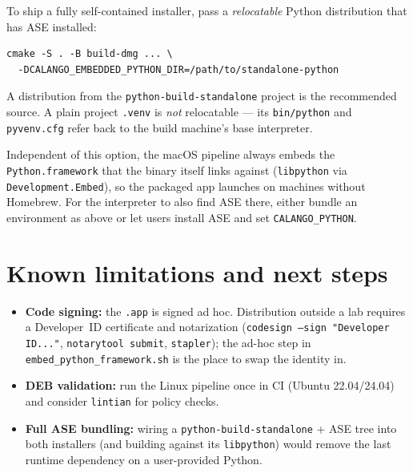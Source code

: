 \documentclass[11pt,a4paper]{article}
\newcommand{\file}[1]{\texttt{#1}}
\newcommand{\opt}[1]{\texttt{#1}}
\begin{document}
To ship a fully self-contained installer, pass a \emph{relocatable}
Python distribution that has ASE installed:

\begin{lstlisting}
cmake -S . -B build-dmg ... \
  -DCALANGO_EMBEDDED_PYTHON_DIR=/path/to/standalone-python
\end{lstlisting}

A distribution from the \texttt{python-build-standalone} project is the
recommended source. A plain project \file{.venv} is \emph{not}
relocatable --- its \file{bin/python} and \file{pyvenv.cfg} refer back to
the build machine's base interpreter.

Independent of this option, the macOS pipeline always embeds the
\file{Python.framework} that the binary itself links against
(\file{libpython} via \opt{Development.Embed}), so the packaged app
launches on machines without Homebrew. For the interpreter to also find
ASE there, either bundle an environment as above or let users install
ASE and set \texttt{CALANGO\_PYTHON}.

\section{Known limitations and next steps}

\begin{itemize}[itemsep=2pt]
  \item \textbf{Code signing:} the \file{.app} is signed ad hoc.
        Distribution outside a lab requires a Developer~ID certificate
        and notarization (\file{codesign --sign "Developer ID..."},
        \file{notarytool submit}, \file{stapler}); the ad-hoc step in
        \file{embed\_python\_framework.sh} is the place to swap the
        identity in.
  \item \textbf{DEB validation:} run the Linux pipeline once in CI
        (Ubuntu 22.04/24.04) and consider \file{lintian} for policy
        checks.
  \item \textbf{Full ASE bundling:} wiring a
        \texttt{python-build-standalone} + ASE tree into both installers
        (and building against its \file{libpython}) would remove the
        last runtime dependency on a user-provided Python.
\end{itemize}
\end{document}
